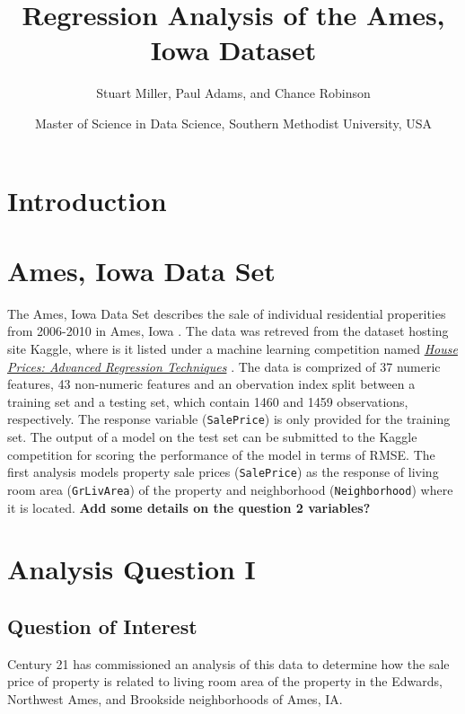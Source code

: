 \documentclass[american,]{article}
\title{Regression Analysis of the Ames, Iowa Dataset}
\author{Stuart Miller, Paul Adams, and Chance Robinson}
\date{Master of Science in Data Science, Southern Methodist University, USA}
\begin{document}
\maketitle

\hypertarget{introduction}{%
\section{Introduction}\label{introduction}}

\citet{Sleuth}

\hypertarget{ames-iowa-data-set}{%
\section{Ames, Iowa Data Set}\label{ames-iowa-data-set}}

The Ames, Iowa Data Set describes the sale of individual residential
properities from 2006-2010 in Ames, Iowa \cite{Cock}. The data was
retreved from the dataset hosting site Kaggle, where is it listed under
a machine learning competition named
\href{https://www.kaggle.com/c/house-prices-advanced-regression-techniques/overview}{\textit{House Prices: Advanced Regression Techniques}}
\cite{Kaggle2016}. The data is comprized of 37 numeric features, 43
non-numeric features and an obervation index split between a training
set and a testing set, which contain 1460 and 1459 observations,
respectively. The response variable (\texttt{SalePrice}) is only
provided for the training set. The output of a model on the test set can
be submitted to the Kaggle competition for scoring the performance of
the model in terms of RMSE. The first analysis models property sale
prices (\texttt{SalePrice}) as the response of living room area
(\texttt{GrLivArea}) of the property and neighborhood
(\texttt{Neighborhood}) where it is located. \textbf{Add some details on
the question 2 variables?}

\hypertarget{analysis-question-i}{%
\section{Analysis Question I}\label{analysis-question-i}}

\hypertarget{question-of-interest}{%
\subsection{Question of Interest}\label{question-of-interest}}

Century 21 has commissioned an analysis of this data to determine how
the sale price of property is related to living room area of the
property in the Edwards, Northwest Ames, and Brookside neighborhoods of
Ames, IA.
\end{document}
